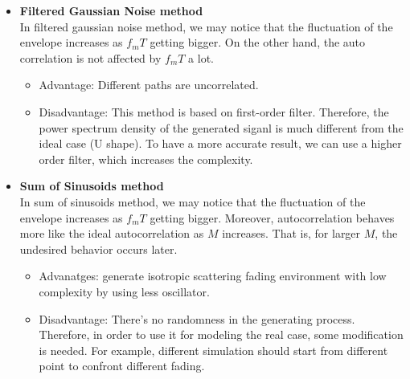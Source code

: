 
\begin{itemize}
    \item \textbf{Filtered Gaussian Noise method} \hfill \\
    In filtered gaussian noise method, we may notice that the fluctuation of the envelope 
    increases as $f_mT$ getting bigger. On the other hand, the auto correlation is not affected 
    by $f_mT$ a lot.
    \begin{itemize}
        \item Advantage: Different paths are uncorrelated.
        \item Disadvantage: This method is based on first-order filter. Therefore, the power 
        spectrum density of the generated siganl is much different from the ideal case (U shape).
        To have a more accurate result, we can use a higher order filter, which increases the complexity.
    \end{itemize}
    \item \textbf{Sum of Sinusoids method} \hfill \\
    In sum of sinusoids method, we may notice that the fluctuation of the envelope 
    increases as $f_mT$ getting bigger. Moreover, autocorrelation behaves more like the ideal 
    autocorrelation as $M$ increases. That is, for larger $M$, the undesired behavior occurs 
    later.
    \begin{itemize}
        \item Advanatges: generate isotropic scattering fading environment with low complexity 
        by using less oscillator.
        \item Disadvantage: There's no randomness in the generating process. Therefore, in order
        to use it for modeling the real case, some modification is needed. For example, different 
        simulation should start from different point to confront different fading.
    \end{itemize}
\end{itemize}